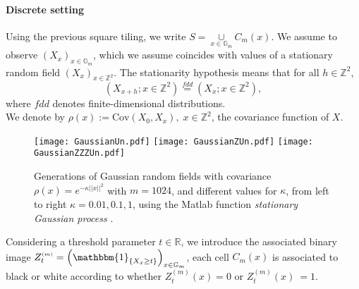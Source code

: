 \documentclass[12pt]{article}
\theoremstyle{Theorem}
\begin{document}
\paragraph{Discrete setting}
Using the previous square tiling, we write $S =  \underset{x \in \mathbb{G}_{m}}{\cup}  C_{m}(x)$. We assume to observe $\left(X_{\scriptscriptstyle x}\right)_{x \in \mathbb{G}_{m}}$, which we assume coincides with values of a stationary random field $\left(X_{\scriptscriptstyle x}\right)_{x \in \mathbb{Z}^{2}}$. The stationarity hypothesis means that for all $h \in \mathbb{Z}^{2}$, 
$$\left(X_{x+h}; x \in \mathbb{Z}^{2} \right)\overset{fdd}{=} \left(X_{\scriptscriptstyle x}; x \in \mathbb{Z}^{2} \right),$$ where $fdd$ denotes finite-dimensional distributions. \\
We denote by $\rho(x) :=\text{Cov}\left(X_{\scriptscriptstyle 0}, X_{\scriptscriptstyle x}\right), \; x \in \mathbb{Z}^{2}$, the covariance function of $X$.
\vspace{-1.5cm}
\begin{figure}[H]
    {\texttt{[image: GaussianUn.pdf]}}
    {\texttt{[image: GaussianZUn.pdf]}}
    {\texttt{[image: GaussianZZZUn.pdf]}}
    \vspace{-2cm}
 \caption{Generations of Gaussian random fields with covariance $\rho(x) = e^{-\kappa||x||^{2}}$ with $m = 1024$, and different values for $\kappa$, from left to right $\kappa = 0.01, 0.1, 1$, using the Matlab function \textit{stationary Gaussian process} \cite{MATLAB}.}
\label{fig22}
\end{figure}
Considering a threshold parameter $t \in \mathbb{R}$, we introduce the associated binary image $Z^{\scriptscriptstyle (m)}_{t} = \left(\mathbbm{1}_{\left\{X_x \geq t\right\}} \right)_{x \in \mathbb{G}_{m}}$, each cell $C_{m}(x)$ is associated to black or white according to whether $Z^{\scriptscriptstyle (m)}_{t} (x) = 0$ or $Z^{\scriptscriptstyle (m)}_{t}(x)~= 1$. 
\end{document}
